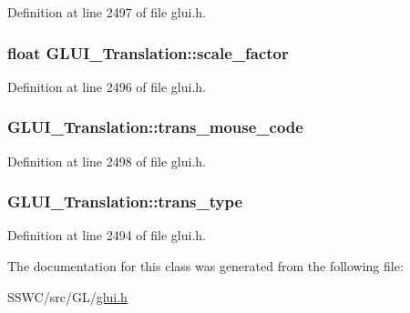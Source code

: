 Definition at line 2497 of file glui.\+h.

\hypertarget{class_g_l_u_i___translation_af90186734b22e53b38be362d40f79bed}{
\subsubsection[{scale\+\_\+factor}]{\setlength{\rightskip}{0pt plus 5cm}float G\+L\+U\+I\+\_\+\+Translation\+::scale\+\_\+factor}}\label{class_g_l_u_i___translation_af90186734b22e53b38be362d40f79bed}


Definition at line 2496 of file glui.\+h.

\hypertarget{class_g_l_u_i___translation_a64a9c96e7cd81d9bac3254190439a0ad}{
\subsubsection[{trans\+\_\+mouse\+\_\+code}]{ G\+L\+U\+I\+\_\+\+Translation\+::trans\+\_\+mouse\+\_\+code}}\label{class_g_l_u_i___translation_a64a9c96e7cd81d9bac3254190439a0ad}


Definition at line 2498 of file glui.\+h.

\hypertarget{class_g_l_u_i___translation_a77dc15982b9c636e04d8bc815507e119}{
\subsubsection[{trans\+\_\+type}]{ G\+L\+U\+I\+\_\+\+Translation\+::trans\+\_\+type}}\label{class_g_l_u_i___translation_a77dc15982b9c636e04d8bc815507e119}


Definition at line 2494 of file glui.\+h.



The documentation for this class was generated from the following file\+:\begin{DoxyCompactItemize}
\item 
S\+S\+W\+C/src/\+G\+L/\hyperlink{glui_8h}{glui.\+h}\end{DoxyCompactItemize}

